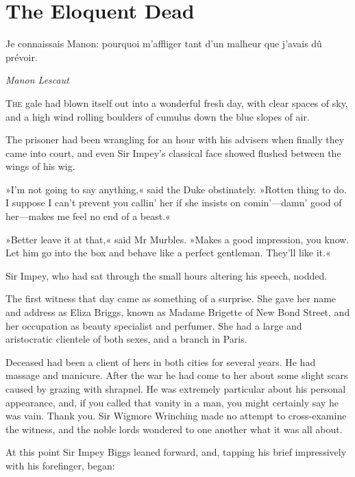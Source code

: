 

\chapter{The Eloquent Dead}

\epigraph{\begin{french}Je connaissais Manon: pourquoi m'affliger tant d'un malheur que j'avais dû prévoir.\end{french}}{\textit{Manon Lescaut}}




\lettrine[lines=4]{T}{he} gale had blown itself out into a wonderful fresh day, with clear
spaces of sky, and a high wind rolling boulders of cumulus down the
blue slopes of air.

\zz
The prisoner had been wrangling for an hour with his advisers when
finally they came into court, and even Sir Impey's classical face
showed flushed between the wings of his wig.

»I'm not going to say anything,« said the Duke obstinately. »Rotten
thing to do. I suppose I can't prevent you callin' her if she insists
on comin'—damn' good of her—makes me feel no end of a beast.«

»Better leave it at that,« said Mr Murbles. »Makes a good impression,
you know. Let him go into the box and behave like a perfect gentleman.
They'll like it.«

Sir Impey, who had sat through the small hours altering his speech,
nodded.

The first witness that day came as something of a surprise. She gave
her name and address as Eliza Briggs, known as Madame Brigette of New
Bond Street, and her occupation as beauty specialist and perfumer. She
had a large and aristocratic clientele of both sexes, and a branch in
Paris.

Deceased had been a client of hers in both cities for several years.
He had massage and manicure. After the war he had come to her about
some slight scars caused by grazing with shrapnel. He was extremely
particular about his personal appearance, and, if you called that
vanity in a man, you might certainly say he was vain. Thank you. Sir
Wigmore Wrinching made no attempt to cross-examine the witness, and the
noble lords wondered to one another what it was all about.

At this point Sir Impey Biggs leaned forward, and, tapping his brief
impressively with his forefinger, began:

